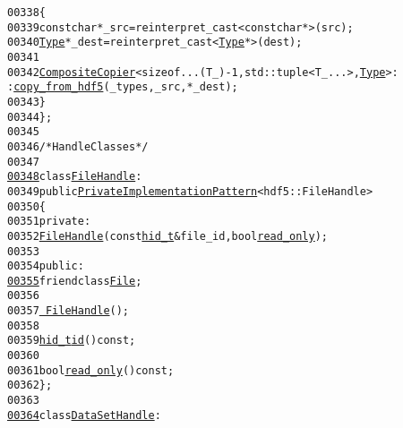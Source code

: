 \begin{footnotesize}
\begin{alltt}
00338 \textcolor{keyword}{                }\{
00339                     \textcolor{keyword}{const} \textcolor{keywordtype}{char} * \_src = \textcolor{keyword}{reinterpret\_cast<}\textcolor{keyword}{const }\textcolor{keywordtype}{char} *\textcolor{keyword}{>}(src);
00340                     \hyperlink{structeos_1_1hdf5_1_1Type}{Type} * \_dest = \textcolor{keyword}{reinterpret\_cast<}\hyperlink{structeos_1_1hdf5_1_1Type}{Type} *\textcolor{keyword}{>}(dest);
00341 
00342                     \hyperlink{structeos_1_1hdf5_1_1CompositeCopier}{CompositeCopier}<\textcolor{keyword}{sizeof}...(T\_) - 1, std::tuple<T\_ ...>, \hyperlink{structeos_1_1hdf5_1_1Type}{Type}>:
      :\hyperlink{classeos_1_1hdf5_1_1Composite_a4504f18af7ad323f89b4635eae9f1695}{copy_from_hdf5}(\_types, \_src, *\_dest);
00343                 \}
00344         \};
00345 
00346         \textcolor{comment}{/* Handle Classes */}
00347 
\hypertarget{hdf5_8hh_source_l00348}{}\hyperlink{classeos_1_1hdf5_1_1FileHandle}{00348}         \textcolor{keyword}{class }\hyperlink{classeos_1_1hdf5_1_1FileHandle}{FileHandle} :
00349             \textcolor{keyword}{public} \hyperlink{classeos_1_1PrivateImplementationPattern}{PrivateImplementationPattern}<hdf5::FileHandle>
00350         \{
00351             \textcolor{keyword}{private}:
00352                 \hyperlink{classeos_1_1hdf5_1_1FileHandle}{FileHandle}(\textcolor{keyword}{const} \hyperlink{namespaceeos_1_1hdf5_a5bd5e209f1bf36cdc5551465dacf2e74}{hid_t} & file\_id, \textcolor{keywordtype}{bool} \hyperlink{classeos_1_1hdf5_1_1FileHandle_a48481c6740c14dc65b04561ad68edef6}{read_only});
00353 
00354             \textcolor{keyword}{public}:
\hypertarget{hdf5_8hh_source_l00355}{}\hyperlink{classeos_1_1hdf5_1_1FileHandle_a68d15876ad188b7628261b12d0eac8aa}{00355}                 \textcolor{keyword}{friend} \textcolor{keyword}{class }\hyperlink{classeos_1_1hdf5_1_1File}{File};
00356 
00357                 \hyperlink{classeos_1_1hdf5_1_1FileHandle_a493e129a4cc5cc14a5b28c66b83c0554}{~FileHandle}();
00358 
00359                 \hyperlink{namespaceeos_1_1hdf5_a5bd5e209f1bf36cdc5551465dacf2e74}{hid_t} \hyperlink{classeos_1_1hdf5_1_1FileHandle_ad82bab7945b094e0504e1956026481ae}{id}() \textcolor{keyword}{const};
00360 
00361                 \textcolor{keywordtype}{bool} \hyperlink{classeos_1_1hdf5_1_1FileHandle_a48481c6740c14dc65b04561ad68edef6}{read_only}() \textcolor{keyword}{const};
00362         \};
00363 
\hypertarget{hdf5_8hh_source_l00364}{}\hyperlink{classeos_1_1hdf5_1_1DataSetHandle}{00364}         \textcolor{keyword}{class }\hyperlink{classeos_1_1hdf5_1_1DataSetHandle}{DataSetHandle} :

\end{alltt}
\end{footnotesize}
